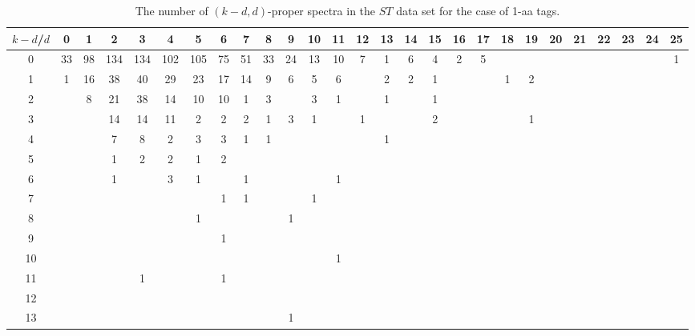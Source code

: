 \documentclass{article}
\begin{document}
\begin{table}[h]\footnotesize
{\centering
\begin{tabular}{|c|c|
c|c|c|c|c|c|c|c|c|c|c|c|c|c|c|c|c|c|c|c|c|c|c|c|c|}
  \hline
  $k-d$/$d$ 
 & 0 & 1 & 2 & 3 & 4 & 5 & 6 & 7 & 8 & 9 & 10 & 11 & 12 & 13 & 14 & 15 & 16 & 17 & 18 & 19 & 20 & 21 & 22 & 23 & 24 & 25\\

  \hline
  \hline

0  & 33 & 98 & 134 & 134 & 102 & 105 & 75 & 51 & 33 & 24 & 13 & 10 & 7 & 1 & 6 & 4 & 2 & 5 &  &  &  &  &  &  &  & 1\\

1  & 1 & 16 & 38 & 40 & 29 & 23 & 17 & 14 & 9 & 6 & 5 & 6 &  & 2 & 2 & 1 &  &  & 1 & 2 &  &  &  &  &  & \\

2  &  & 8 & 21 & 38 & 14 & 10 & 10 & 1 & 3 &  & 3 & 1 &  & 1 &  & 1 &  &  &  &  &  &  &  &  &  & \\

3  &  &  & 14 & 14 & 11 & 2 & 2 & 2 & 1 & 3 & 1 &  & 1 &  &  & 2 &  &  &  & 1 &  &  &  &  &  & \\

4  &  &  & 7 & 8 & 2 & 3 & 3 & 1 & 1 &  &  &  &  & 1 &  &  &  &  &  &  &  &  &  &  &  & \\

5  &  &  & 1 & 2 & 2 & 1 & 2 &  &  &  &  &  &  &  &  &  &  &  &  &  &  &  &  &  &  & \\

6  &  &  & 1 &  & 3 & 1 &  & 1 &  &  &  & 1 &  &  &  &  &  &  &  &  &  &  &  &  &  & \\

7  &  &  &  &  &  &  & 1 & 1 &  &  & 1 &  &  &  &  &  &  &  &  &  &  &  &  &  &  & \\

8  &  &  &  &  &  & 1 &  &  &  & 1 &  &  &  &  &  &  &  &  &  &  &  &  &  &  &  & \\

9  &  &  &  &  &  &  & 1 &  &  &  &  &  &  &  &  &  &  &  &  &  &  &  &  &  &  & \\

10  &  &  &  &  &  &  &  &  &  &  &  & 1 &  &  &  &  &  &  &  &  &  &  &  &  &  & \\

11  &  &  &  & 1 &  &  & 1 &  &  &  &  &  &  &  &  &  &  &  &  &  &  &  &  &  &  & \\

12  &  &  &  &  &  &  &  &  &  &  &  &  &  &  &  &  &  &  &  &  &  &  &  &  &  & \\

13  &  &  &  &  &  &  &  &  &  & 1 &  &  &  &  &  &  &  &  &  &  &  &  &  &  &  & \\

  \hline
\end{tabular}
\par}
\centering
\caption{The number of $(k-d,d)$-proper spectra in the $ST$ data set for the case of 1-aa tags.}
\vspace{3mm}
\label{table:kd-1-ST}
\end{table}
\end{document}
